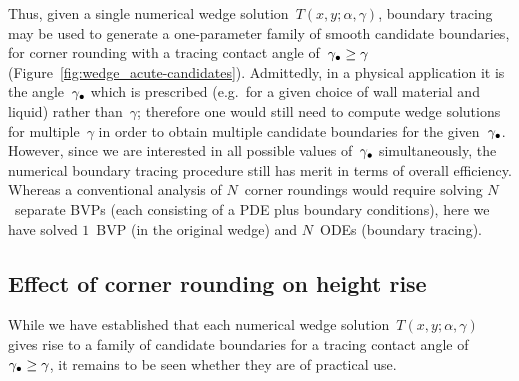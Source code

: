 Thus, given a single numerical wedge solution~$T (x, y; \alpha, \gamma)$,
boundary tracing may be used to generate a one-parameter family
of smooth candidate boundaries,
for corner rounding
with a tracing contact angle of~$\gamma_\bullet \ge \gamma$
(Figure~\ref{fig:wedge_acute-candidates}).
Admittedly, in a physical application
it is the angle~$\gamma_\bullet$ which is prescribed
(e.g.~for a given choice of wall material and liquid)
rather than~$\gamma$;
therefore one would still need to compute wedge solutions
for multiple~$\gamma$
in order to obtain multiple candidate boundaries
for the given~$\gamma_\bullet$.
However, since we are interested in
all possible values of~$\gamma_\bullet$ simultaneously,
the numerical boundary tracing procedure
still has merit in terms of overall efficiency.
Whereas a conventional analysis of $N$~corner roundings
would require solving $N$~separate BVPs
(each consisting of a PDE plus boundary conditions),
here we have solved $1$~BVP (in the original wedge)
and $N$~ODEs (boundary tracing).

\subsection{Effect of corner rounding on height rise}
\label{sec:moderate.multiple.effect}

While we have established that
each numerical wedge solution~$T (x, y; \alpha, \gamma)$
gives rise to a family of candidate boundaries
for a tracing contact angle of~$\gamma_\bullet \ge \gamma$,
it remains to be seen whether they are of practical use.

\begin{figure}
\end{figure}

